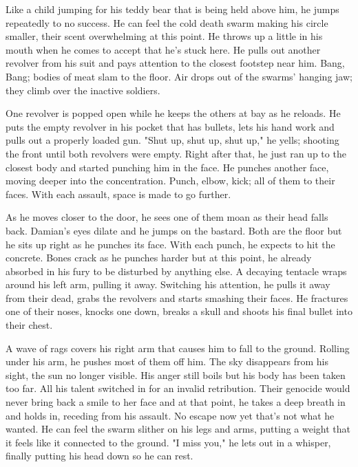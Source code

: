 \begin{Document}
        Like a child jumping for his teddy bear that is being held above him, he jumps repeatedly to no success. He can feel the cold death swarm making his
    circle smaller, their scent overwhelming at this point. He throws up a little in his mouth when he comes to accept that he's stuck here. He pulls out another
    revolver from his suit and pays attention to the closest footstep near him. Bang, Bang; bodies of meat slam to the floor. Air drops out of the swarms'
    hanging jaw; they climb over the inactive soldiers. 

        One revolver is popped open while he keeps the others at bay as he reloads. He puts the empty revolver in his pocket that has bullets, lets his hand 
    work and pulls out a properly loaded gun. "Shut up, shut up, shut up," he yells; shooting the front until both revolvers were empty. Right after that, he
    just ran up to the closest body and started punching him in the face. He punches another face, moving deeper into the concentration. Punch, elbow, kick; all
    of them to their faces. With each assault, space is made to go further. 

        As he moves closer to the door, he sees one of them moan as their head falls back. Damian's eyes dilate and he jumps on the bastard. Both are the floor
    but he sits up right as he punches its face. With each punch, he expects to hit the concrete. Bones crack as he punches harder but at this point, he already
    absorbed in his fury to be disturbed by anything else. A decaying tentacle wraps around his left arm, pulling it away. Switching his attention, he pulls
    it away from their dead, grabs the revolvers and starts smashing their faces. He fractures one of their noses, knocks one down, breaks a skull and shoots
    his final bullet into their chest. 

        A wave of rags covers his right arm that causes him to fall to the ground. Rolling under his arm, he pushes most of them off him. The sky disappears from
    his sight, the sun no longer visible. His anger still boils but his body has been taken too far. All his talent switched in for an invalid retribution. Their
    genocide would never bring back a smile to her face and at that point, he takes a deep breath in and holds in, receding from his assault. No escape now yet
    that's not what he wanted. He can feel the swarm slither on his legs and arms, putting a weight that it feels like it connected to the ground. "I miss you,"
    he lets out in a whisper, finally putting his head down so he can rest.
\end{Document}
